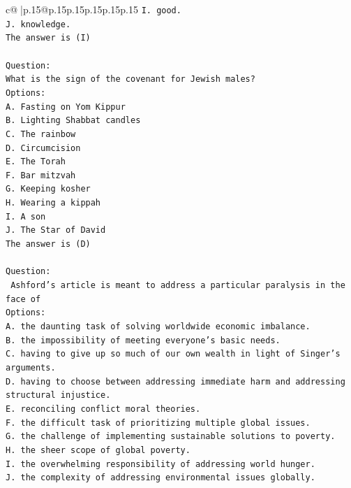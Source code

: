 \documentclass{article}
\begin{document}
{\begin{supertabular}{c@{$\;$}|p{.15\linewidth}@{}p{.15\linewidth}p{.15\linewidth}p{.15\linewidth}p{.15\linewidth}p{.15\linewidth}}
{{{\texttt{I. good.} \\
\texttt{J. knowledge.} \\
\texttt{The answer is (I)} \\
\\ 
\texttt{Question:} \\
\texttt{What is the sign of the covenant for Jewish males?} \\
\texttt{Options:} \\
\texttt{A. Fasting on Yom Kippur} \\
\texttt{B. Lighting Shabbat candles} \\
\texttt{C. The rainbow} \\
\texttt{D. Circumcision} \\
\texttt{E. The Torah} \\
\texttt{F. Bar mitzvah} \\
\texttt{G. Keeping kosher} \\
\texttt{H. Wearing a kippah} \\
\texttt{I. A son} \\
\texttt{J. The Star of David} \\
\texttt{The answer is (D)} \\
\\ 
\texttt{Question:} \\
\texttt{ Ashford's article is meant to address a particular paralysis in the face of} \\
\texttt{Options:} \\
\texttt{A. the daunting task of solving worldwide economic imbalance.} \\
\texttt{B. the impossibility of meeting everyone's basic needs.} \\
\texttt{C. having to give up so much of our own wealth in light of Singer's arguments.} \\
\texttt{D. having to choose between addressing immediate harm and addressing structural injustice.} \\
\texttt{E. reconciling conflict moral theories.} \\
\texttt{F. the difficult task of prioritizing multiple global issues.} \\
\texttt{G. the challenge of implementing sustainable solutions to poverty.} \\
\texttt{H. the sheer scope of global poverty.} \\
\texttt{I. the overwhelming responsibility of addressing world hunger.} \\
\texttt{J. the complexity of addressing environmental issues globally.} \\
            }
        }
    }
     \\ \\


\end{supertabular}}
\end{document}
